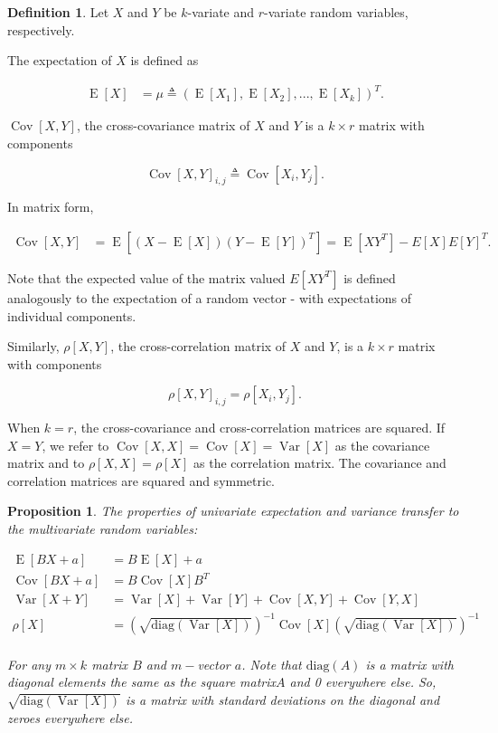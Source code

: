 \documentclass{book}
\theoremstyle{plain}%
\newtheorem{proposition}{Proposition}[section]
\theoremstyle{definition}
\newtheorem{definition}{Definition}[section]
\DeclareMathOperator{\Var}{Var}
\DeclareMathOperator{\Cov}{Cov}
\DeclareMathOperator{\E}{E}
\begin{document}
\begin{definition} Let $X$ and $Y$ be $k$-variate and $r$-variate random variables, respectively.

The expectation of $X$ is defined as

\begin{align*}
\E[X] &= \mu \triangleq (\E[X_1], \E[X_2],...,\E[X_k])^T.
\end{align*}

$\Cov[X,Y]$, the cross-covariance matrix of $X$ and $Y$ is a $k \times r$ matrix with components

$$\Cov[X,Y]_{i,j} \triangleq \Cov[X_i, Y_j].$$

In matrix form,

\begin{align*}
\Cov[X,Y] &= \E[(X - \E[X])(Y - \E[Y])^T] = \E[XY^T] - E[X]E[Y]^T.
\end{align*}

Note that the expected value of the matrix valued $E[XY^T]$ is defined analogously to the expectation of a random vector - with expectations of individual components.

Similarly, $\rho[X,Y]$, the cross-correlation matrix of $X$ and $Y$, is a $k \times r$ matrix with components

$$\rho[X,Y]_{i,j} = \rho[X_i, Y_j].$$

When $k = r$, the cross-covariance and cross-correlation matrices are squared. If $X = Y$, we refer to $\Cov[X,X] = \Cov[X] = \Var[X]$ as the covariance matrix and to $\rho[X,X] = \rho[X]$ as the correlation matrix. The covariance and correlation matrices are squared and symmetric.
\end{definition}

\begin{proposition} The properties of univariate expectation and variance transfer to the multivariate random variables:

\begin{align*}
\E[BX + a] &= B\E[X] + a\\
\Cov[BX + a] &= B\Cov[X]B^T\\
\Var[X + Y] &= \Var[X] + \Var[Y] + \Cov[X,Y] + \Cov[Y,X]\\
\rho[X] &= \left(\sqrt{\text{diag}(\Var[X])}\right)^{-1} \Cov[X] \left(\sqrt{\text{diag}(\Var[X])}\right)^{-1}\\
\end{align*}

For any $m \times k$ matrix $B$ and $m-$vector $a$. Note that $\text{diag}(A)$ is a matrix with diagonal elements the same as the square matrix$A$ and 0 everywhere else. So, $\sqrt{\text{diag}(\Var[X])}$ is a matrix with standard deviations on the diagonal and zeroes everywhere else. \label{prop:multi}

\end{proposition}
\end{document}
